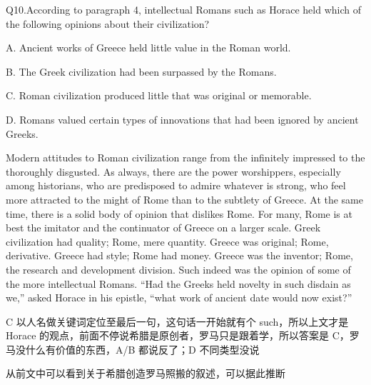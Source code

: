 \begin{blk}
    \begin{qst}
        Q10.According to paragraph 4, intellectual Romans such as Horace held which of the following opinions about their civilization?
    \end{qst}

    \begin{chc}
        A. Ancient works of Greece held little value in the Roman world.

        B. The Greek civilization had been surpassed by the Romans.

        C. Roman civilization produced little that was original or memorable.

        D. Romans valued certain types of innovations that had been ignored by ancient Greeks.
    \end{chc}

    \begin{psgq}
        Modern attitudes to Roman civilization range from the infinitely impressed to the thoroughly disgusted. As always, there are the power worshippers, especially among historians, who are predisposed to admire whatever is strong, who feel more attracted to the might of Rome than to the subtlety of Greece. At the same time, there is a solid body of opinion that dislikes Rome. For many, Rome is at best the imitator and the continuator of Greece on a larger scale. Greek civilization had quality; Rome, mere quantity. Greece was original; Rome, derivative. Greece had style; Rome had money. Greece was the inventor; Rome, the research and development division. Such indeed was the opinion of some of the more intellectual Romans. “Had the Greeks held novelty in such disdain as we,” asked Horace in his epistle, “what work of ancient date would now exist?”
    \end{psgq}

    \begin{nlz}
        C 以人名做关键词定位至最后一句，这句话一开始就有个 such，所以上文才是 Horace 的观点，前面不停说希腊是原创者，罗马只是跟着学，所以答案是 C，罗马没什么有价值的东西，A/B 都说反了；D 不同类型没说

        从前文中可以看到关于希腊创造罗马照搬的叙述，可以据此推断
    \end{nlz}
\end{blk}

